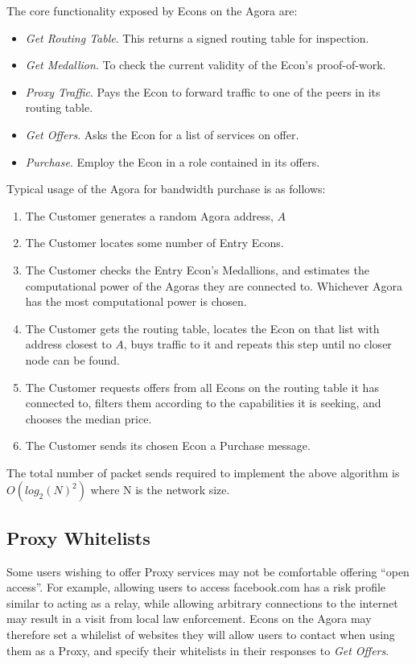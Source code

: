 \documentclass{article}
\begin{document}
The core functionality exposed by Econs on the Agora are:

\begin{itemize}
    \item \emph{Get Routing Table}. This returns a signed routing table for inspection.
    \item \emph{Get Medallion}. To check the current validity of the Econ's proof-of-work.
    \item \emph{Proxy Traffic}. Pays the Econ to forward traffic to one of the peers in its routing table.
    \item \emph{Get Offers}. Asks the Econ for a list of services on offer.
    \item \emph{Purchase}. Employ the Econ in a role contained in its offers.
\end{itemize}

Typical usage of the Agora for bandwidth purchase is as follows:

\begin{enumerate}
    \item The Customer generates a random Agora address, $A$
    \item The Customer locates some number of Entry Econs.
    \item The Customer checks the Entry Econ's Medallions, and estimates the computational power of the Agoras they are connected to. Whichever Agora has the most computational power is chosen.
    \item The Customer gets the routing table, locates the Econ on that list with address closest to $A$, buys traffic to it and repeats this step until no closer node can be found.
    \item The Customer requests offers from all Econs on the routing table it has connected to, filters them according to the capabilities it is seeking, and chooses the median price.
    \item The Customer sends its chosen Econ a Purchase message.
\end{enumerate}

The total number of packet sends required to implement the above algorithm is $O(log_2(N)^2)$ where N is the network size.

\subsection{Proxy Whitelists}

Some users wishing to offer Proxy services may not be comfortable offering ``open access''. For example, allowing users to access facebook.com has a risk profile similar to acting as a relay, while allowing arbitrary connections to the internet may result in a visit from local law enforcement. Econs on the Agora may therefore set a whilelist of websites they will allow users to contact when using them as a Proxy, and specify their whitelists in their responses to \emph{Get Offers}.
\end{document}
